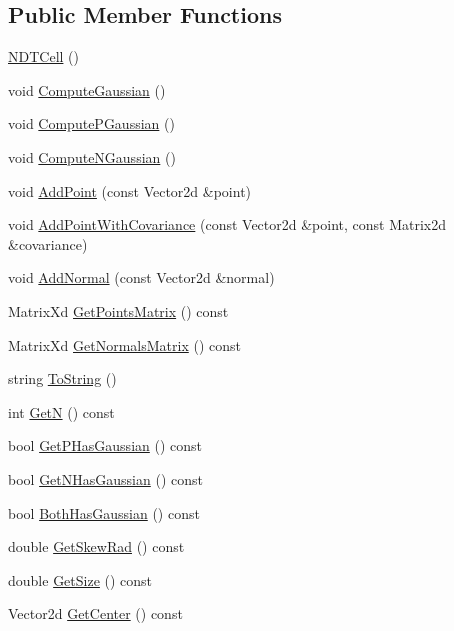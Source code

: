 \subsection*{Public Member Functions}
\begin{DoxyCompactItemize}
\item 
\hyperlink{classNDTCell_acfc90537523f63170f002f74d7db1bd5}{N\+D\+T\+Cell} ()
\item 
void \hyperlink{classNDTCell_afdc99c3644f62eeffff96f98fe3fdeda}{Compute\+Gaussian} ()
\item 
void \hyperlink{classNDTCell_a7e8ff09fd2f739e3185721fd3c6bc910}{Compute\+P\+Gaussian} ()
\item 
void \hyperlink{classNDTCell_a3c390e46a748a735f528495d3c14f4a6}{Compute\+N\+Gaussian} ()
\item 
void \hyperlink{classNDTCell_a3471fe2826aa78a9f36e0f6435ad564e}{Add\+Point} (const Vector2d \&point)
\item 
void \hyperlink{classNDTCell_a0724e1fb86da119b2886bc63490152a2}{Add\+Point\+With\+Covariance} (const Vector2d \&point, const Matrix2d \&covariance)
\item 
void \hyperlink{classNDTCell_ada906677c0bf7f0c614bce81c4493425}{Add\+Normal} (const Vector2d \&normal)
\item 
Matrix\+Xd \hyperlink{classNDTCell_a942f05a2aac27a698113aac5e84e328a}{Get\+Points\+Matrix} () const
\item 
Matrix\+Xd \hyperlink{classNDTCell_aa868a56366702ac5d5871c10af438a66}{Get\+Normals\+Matrix} () const
\item 
string \hyperlink{classNDTCell_ae1e1133b097ce7e78fbff8a1fda4ae59}{To\+String} ()
\item 
int \hyperlink{classNDTCell_a0bb405d7e5bc95bd21848ae3d6283f71}{GetN} () const
\item 
bool \hyperlink{classNDTCell_ac4ba033f59542e40722105b6aec5540f}{Get\+P\+Has\+Gaussian} () const
\item 
bool \hyperlink{classNDTCell_a2953d2b36d9887794f9aa7637a52c80b}{Get\+N\+Has\+Gaussian} () const
\item 
bool \hyperlink{classNDTCell_a7864f7609b376f7c60af9a715081608b}{Both\+Has\+Gaussian} () const
\item 
double \hyperlink{classNDTCell_adb431bb96255a7a6dbafc15da7e0fdf6}{Get\+Skew\+Rad} () const
\item 
double \hyperlink{classNDTCell_a0dee81a09a00843003766536998b73f0}{Get\+Size} () const
\item 
Vector2d \hyperlink{classNDTCell_a322b936861945a4da2e712295529eda3}{Get\+Center} () const

\end{DoxyCompactItemize}
